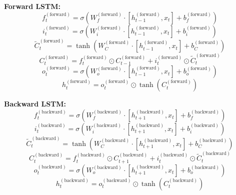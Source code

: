\documentclass[sn-mathphys,Numbered]{sn-jnl}
\theoremstyle{thmstyleone}
\theoremstyle{thmstyletwo}
\theoremstyle{thmstylethree}
\begin{document}
\textbf{Forward LSTM:}
\begin{equation}
f_t^{(\text{forward})} = \sigma(W_{f}^{(\text{forward})} \cdot [h_{t-1}^{(\text{forward})}, x_t] + b_{f}^{(\text{forward})})
\end{equation}
\begin{equation}
i_t^{(\text{forward})} = \sigma(W_{i}^{(\text{forward})} \cdot [h_{t-1}^{(\text{forward})}, x_t] + b_{i}^{(\text{forward})})
\end{equation}
\begin{equation}
\tilde{C}_t^{(\text{forward})} = \tanh(W_{C}^{(\text{forward})} \cdot [h_{t-1}^{(\text{forward})}, x_t] + b_{C}^{(\text{forward})})
\end{equation}
\begin{equation}
C_t^{(\text{forward})} = f_t^{(\text{forward})} \odot C_{t-1}^{(\text{forward})} + i_t^{(\text{forward})} \odot \tilde{C}_t^{(\text{forward})}
\end{equation}
\begin{equation}
o_t^{(\text{forward})} = \sigma(W_{o}^{(\text{forward})} \cdot [h_{t-1}^{(\text{forward})}, x_t] + b_{o}^{(\text{forward})})
\end{equation}
\begin{equation}
h_t^{(\text{forward})} = o_t^{(\text{forward})} \odot \tanh(C_t^{(\text{forward})})
\end{equation}

\textbf{Backward LSTM:}
\begin{equation}
f_t^{(\text{backward})} = \sigma(W_{f}^{(\text{backward})} \cdot [h_{t+1}^{(\text{backward})}, x_t] + b_{f}^{(\text{backward})})
\end{equation}
\begin{equation}
i_t^{(\text{backward})} = \sigma(W_{i}^{(\text{backward})} \cdot [h_{t+1}^{(\text{backward})}, x_t] + b_{i}^{(\text{backward})})
\end{equation}
\begin{equation}
\tilde{C}_t^{(\text{backward})} = \tanh(W_{C}^{(\text{backward})} \cdot [h_{t+1}^{(\text{backward})}, x_t] + b_{C}^{(\text{backward})})
\end{equation}
\begin{equation}
C_t^{(\text{backward})} = f_t^{(\text{backward})} \odot C_{t+1}^{(\text{backward})} + i_t^{(\text{backward})} \odot \tilde{C}_t^{(\text{backward})}
\end{equation}
\begin{equation}
o_t^{(\text{backward})} = \sigma(W_{o}^{(\text{backward})} \cdot [h_{t+1}^{(\text{backward})}, x_t] + b_{o}^{(\text{backward})})
\end{equation}
\begin{equation}
h_t^{(\text{backward})} = o_t^{(\text{backward})} \odot \tanh(C_t^{(\text{backward})})
\end{equation}
\end{document}

